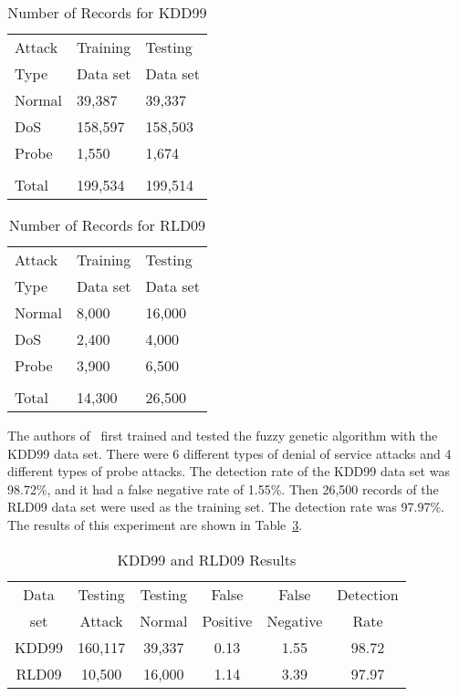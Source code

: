 \documentclass{sig-alternate}
\begin{document}
\begin{table}
\caption{Number of Records for KDD99}
\begin{tabular}{|lll|} \hline
Attack & Training & Testing\\
Type   & Data set & Data set\\ \hline
Normal & 39,387 & 39,337\\
DoS & 158,597 & 158,503\\
Probe & 1,550 & 1,674\\
 & &\\
 Total & 199,534 & 199,514\\
\hline\end{tabular}
\label{tab:RecordsForKDD99}
\end{table}


\begin{table}
\caption{Number of Records for RLD09}
\begin{tabular}{|lll|} \hline
Attack & Training & Testing\\
Type   & Data set & Data set\\ \hline
Normal & 8,000 & 16,000\\
DoS & 2,400 & 4,000\\
Probe & 3,900 & 6,500\\
 & &\\
 Total & 14,300 & 26,500\\
\hline\end{tabular}
\label{tab:RecordsForRLD09}
\end{table}

The authors of~\cite{6496342, 6559603} first trained and tested the fuzzy genetic algorithm with the KDD99 data set. There were 6 different types of denial of service attacks and 4 different types of probe attacks. The detection rate of the KDD99 data set was 98.72\%, and it had a false negative rate of 1.55\%. Then 26,500 records of the RLD09 data set were used as the training set. The detection rate was 97.97\%. The results of this experiment are shown in Table~\ref{tab:bothSetsResults}.

\begin{table}
\caption{KDD99 and RLD09 Results}
\begin{tabular}{|cccccc|} \hline
Data & Testing & Testing & False    & False    & Detection\\
set  & Attack  & Normal  & Positive & Negative & Rate\\ \hline
KDD99 & 160,117 & 39,337 & 0.13 & 1.55 & 98.72\\
RLD09 & 10,500 & 16,000 & 1.14 & 3.39 & 97.97\\
\hline\end{tabular}
\label{tab:bothSetsResults}
\end{table}
\end{document}
